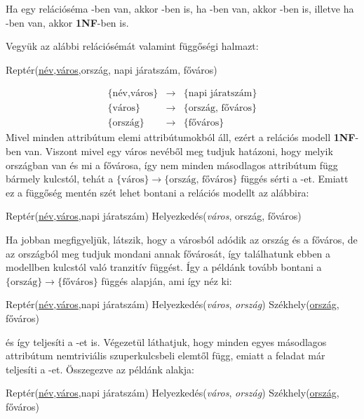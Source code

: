 \begin{tet}
Ha egy relációséma \BCNF-ben van, akkor \nfh-ben is, ha \nfh-ben van, akkor \nfk -ben is, illetve ha \nfk-ben van, akkor \textbf{1NF}-ben is. 
\end{tet}

\begin{pld}
Vegyük az alábbi relációsémát valamint függőségi halmazt:
\begin{center}
    Reptér(\underline{név},\underline{város},ország, napi járatszám, főváros)
\end{center}
$$
    \begin{matrix}
    \{\text{név,város}\} & \longrightarrow & \{\text{napi járatszám}\} \\
    \{\text{város}\} & \longrightarrow & \{\text{ország, főváros}\} \\
   \{\text{ország}\}  & \longrightarrow & \{\text{főváros}\}
    \end{matrix}
$$
Mivel minden attribútum elemi attribútumokból áll, ezért a relációs modell \textbf{1NF}-ben van. Viszont mivel egy város nevéből meg tudjuk hatázoni, hogy melyik országban van és mi a fővárosa, így nem minden másodlagos attribútum függ bármely kulcstól, tehát a $\{\text{város}\} \rightarrow \{\text{ország, főváros}\}$ függés sérti a \nfk-et. Emiatt ez a függőség mentén szét lehet bontani a relációs modellt az alábbira:
\begin{center}
    Reptér(\underline{név},\underline{város},napi járatszám) \break
    Helyezkedés(\textit{város}, ország, főváros)
\end{center}
Ha jobban megfigyeljük, látszik, hogy a városból adódik az ország és a főváros, de az országból meg tudjuk mondani annak fővárosát, így találhatunk ebben a modellben kulcstól való tranzitív függést. Így a példánk tovább bontani a $\{\text{ország}\} \rightarrow \{\text{főváros}\}$ függés alapján, ami így néz ki:
\begin{center}
    Reptér(\underline{név},\underline{város},napi járatszám) \break
    Helyezkedés(\textit{város}, \textit{ország})\break
    Székhely(\underline{ország}, főváros)
\end{center}
és így teljesíti a \nfh-et is. Végezetül láthatjuk, hogy minden egyes másodlagos attribútum nemtriviális szuperkulcsbeli elemtől függ, emiatt a feladat már teljesíti a \BCNF-et.\hfill \break
Összegezve az példánk \BCNF alakja:
\begin{center}
    Reptér(\underline{név},\underline{város},napi járatszám) \break
    Helyezkedés(\textit{város}, \textit{ország})\break
    Székhely(\underline{ország}, főváros)
\end{center}
\end{pld}
